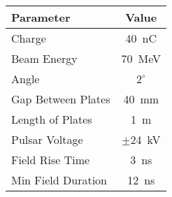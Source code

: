 \documentclass[portrait,final,paperwidth=92cm, paperheight=152cm,  fontscale=0.277]{baposter}
\begin{document}
\begin{poster}
{		
\vspace{2.5em}
\begin{center}
	\begin{singlespace}
			\begin{tabular}{lc}
			\hline  %
			\textbf{Parameter} & \textbf{Value} \\ \hline
			Charge       		& \SI{40}{nC}    \\ %
			Beam Energy  		& \SI{70}{MeV}  \\ %
			Angle 	     		& $2^{\circ}$ 	\\ 
			Gap Between Plates  & \SI{40}{mm}	\\		 
			Length of Plates    & \SI{1}{m}	\\
			Pulsar Voltage      & $\pm$\SI{24}{kV} \\
			Field Rise Time  	& \SI{3}{ns}    \\
			Min Field Duration 	& \SI{12}{ns}  \\ \hline%
		\end{tabular}
	\end{singlespace}

\end{center}

}


\end{poster}
\end{document}
